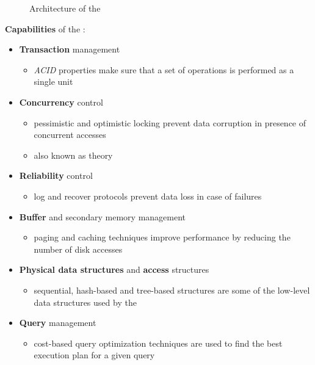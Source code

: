 \documentclass[english]{article}
\begin{document}
\begin{figure}[htbp]
  \centering
  \bigskip
  \bigskip
  \caption{Architecture of the \dbms}
  \label{fig:architecture}
\end{figure}

\bigskip
\textbf{Capabilities} of the \dbms:

\begin{itemize}
  \item \textbf{Transaction} management
        \begin{itemize}[label=\(\rightarrow\)]
          \item \textit{ACID} properties make sure that a set of operations is performed as a single unit
        \end{itemize}
  \item \textbf{Concurrency} control
        \begin{itemize}[label=\(\rightarrow\)]
          \item pessimistic and optimistic locking prevent data corruption in presence of concurrent accesses
          \item also known as \cc theory
        \end{itemize}
  \item \textbf{Reliability} control
        \begin{itemize}[label=\(\rightarrow\)]
          \item log and recover protocols prevent data loss in case of failures
        \end{itemize}
  \item \textbf{Buffer} and secondary memory management
        \begin{itemize}[label=\(\rightarrow\)]
          \item paging and caching techniques improve performance by reducing the number of disk accesses
        \end{itemize}
  \item \textbf{Physical data structures} and \textbf{access} structures
        \begin{itemize}[label=\(\rightarrow\)]
          \item sequential, hash-based and tree-based structures are some of the low-level data structures used by the \dbms
        \end{itemize}
  \item \textbf{Query} management
        \begin{itemize}[label=\(\rightarrow\)]
          \item cost-based query optimization techniques are used to find the best execution plan for a given query
        \end{itemize}
\end{itemize}
\end{document}
